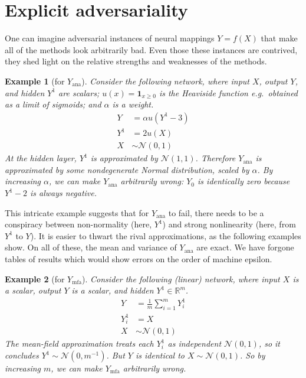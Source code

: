 \documentclass{article}
\newtheorem{example}{Example}
\begin{document}
\section{Explicit adversariality}
One can imagine adversarial instances of neural mappings \(Y=f(X)\) that make all of the methods look arbitrarily bad.
Even those these instances are contrived, they shed light on the relative strengths and weaknesses of the methods.

\begin{example}[for \(Y_\mathrm{ana}\)]
  Consider the following network, where input \(X\), output \(Y\), and hidden \(Y^1\) are scalars; \(u(x) = \bm{1}_{x \geq 0}\) is the Heaviside function e.g.~obtained as a limit of sigmoids; and \(\alpha\) is a weight.
  \begin{align*}
    Y &= \alpha u(Y^1 - 3)
    \\
    Y^1 &= 2 u(X)
    \\
    X &\sim \mathcal N(0, 1)
  \end{align*}
  At the hidden layer, \(Y^1 \) is approximated by \(\mathcal N(1, 1)\).
  Therefore \(Y_\mathrm{ana}\) is approximated by some nondegenerate Normal distribution, scaled by \(\alpha\).
  By increasing \(\alpha\), we can make \(Y_\mathrm{ana}\) arbitrarily wrong:
  \(Y_0\) is identically zero because \(Y^1 -2 \) is always negative.

  
\end{example}

This intricate example suggests that for \(Y_\mathrm{ana}\) to fail, there needs to be a conspiracy between non-normality (here, \(Y^1\)) and strong nonlinearity (here, from \(Y^1\) to \(Y\)).
It is easier to thwart the rival approximations, as the following examples show.
On all of these, the mean and variance of \(Y_\mathrm{ana}\) are exact.
We have forgone tables of results which would show errors on the order of machine epsilon.

\begin{example}[for \(Y_\mathrm{mfa}\)]
  \label{ex:mean-field}
  Consider the   following (linear) network, where input \(X\) is a scalar, output \(Y\) is a scalar, and hidden \(Y^1\in \mathbb{R}^m\).
  \begin{align*}
    Y &= \frac{1}{m} \sum_{i=1}^m Y^1_i
    \\
    Y^1_i &= X
    \\
    X &\sim \mathcal N(0, 1)
  \end{align*}
  The mean-field approximation treats each \(Y_i^1\) as independent \(\mathcal N(0, 1)\), so it concludes \(Y^1\sim \mathcal N(0, m^{-1})\).
  But \(Y\) is identical to \(X\sim \mathcal N(0, 1)\).
  So by increasing \(m\), we can make \(Y_\mathrm{mfa}\) arbitrarily wrong.
\end{example}
\end{document}
